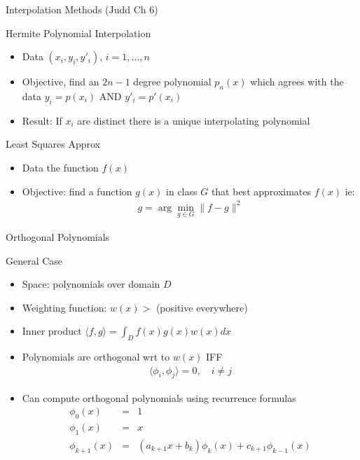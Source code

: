 \documentclass[aspectratio=169,11pt]{beamer}
\begin{document}
\begin{frame}{Interpolation Methods  (Judd Ch 6)}
\begin{block}{Hermite Polynomial Interpolation}
\begin{itemize}
\item Data $(x_i,y_i,y'_i)$, $i=1,\ldots,n$
\item Objective, find an $2n-1$ degree polynomial $p_n(x)$ which agrees with the data $y_i = p(x_i)$ AND $y'_i = p'(x_i)$
\item Result: If $x_i$ are distinct there is a unique interpolating polynomial
\end{itemize}
\end{block}
\begin{block}{Least Squares Approx}
\begin{itemize}
\item Data the function $f(x)$
\item Objective: find a function $g(x)$ in class $G$ that best approximates $f(x)$ ie:
\begin{eqnarray*}
g = \arg \min_{g \in G} \| f-g\|^2
\end{eqnarray*}
\end{itemize}
\end{block}
\end{frame}

\begin{frame}{Orthogonal Polynomials}
\begin{block}{General Case}
\begin{itemize}
\item Space: polynomials over domain $D$
\item Weighting function: $w(x) > $ (positive everywhere)
\item Inner product $\langle f,g \rangle = \int_D f(x) g(x) w(x) d x$
\item Polynomials are orthogonal wrt to $w(x)$ IFF 
\begin{eqnarray*}
\langle \phi_i, \phi_j \rangle = 0, \quad i \neq j
\end{eqnarray*}
\item Can compute orthogonal polynomials using recurrence formulas
\begin{eqnarray*}
\phi_0(x) &=& 1\\
\phi_1(x) &=& x \\
\phi_{k+1}(x) &=& (a_{k+1} x + b_k) \phi_k(x) + c_{k+1} \phi_{k-1}(x)
\end{eqnarray*}
\end{itemize}
\end{block}
\end{frame}
\end{document}
